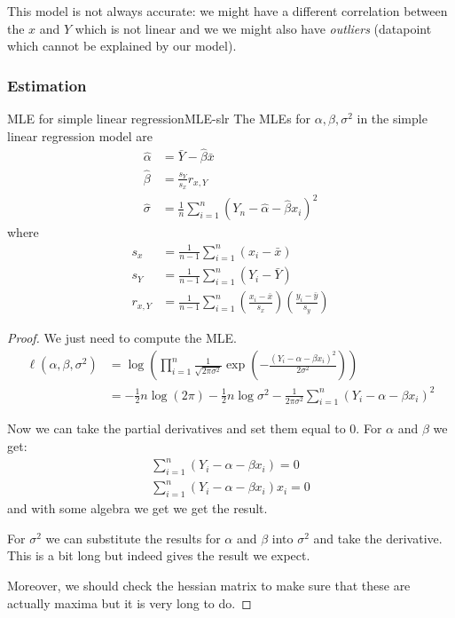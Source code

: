 \documentclass[12pt]{extarticle}
\begin{document}
This model is not always accurate: we might have a different correlation between the $x$ and $Y$ which is not linear
and we we might also have \emph{outliers} (datapoint which cannot be explained by our model).

\subsubsection{Estimation}

\begin{theorem}{MLE for simple linear regression}{MLE-slr}
    The MLEs for $\alpha, \beta, \sigma^2$ in the simple linear regression model are
    \begin{align}
        \hat \alpha & = \bar Y - \hat \beta \bar x                                       \\
        \hat \beta  & = \frac{s_Y}{s_x} r_{x, Y}                                         \\
        \hat \sigma & = \frac{1}{n} \sum_{i = 1}^n (Y_n - \hat \alpha- \hat \beta x_i)^2
    \end{align}
    where
    \begin{align}
        s_x      & = \frac{1}{n - 1} \sum^n_{i = 1}(x_i - \bar x)                                                              \\
        s_Y      & = \frac{1}{n - 1} \sum^n_{i = 1}(Y_i - \bar Y)                                                              \\
        r_{x, Y} & = \frac{1}{n - 1} \sum^n_{i = 1}\left(\frac{x_i - \bar x}{s_x}\right) \left(\frac{y_i - \bar y}{s_y}\right)
    \end{align}
\end{theorem}

\begin{proof}
    We just need to compute the MLE.
    \begin{align}
        \ell(\alpha, \beta, \sigma^2) & = \log\left( \prod_{i = 1}^n \frac{1}{\sqrt{2 \pi \sigma ^2}} \exp \left( - \frac{(Y_i - \alpha - \beta x_i)^2}{2 \sigma^2} \right) \right) \\
                                      & = -\frac{1}{2} n \log(2 \pi) - \frac{1}{2} n \log \sigma^2 - \frac{1}{2 \pi \sigma ^2} \sum_{i = 1}^n  (Y_i - \alpha - \beta x_i)^2
    \end{align}

    Now we can take the partial derivatives and set them equal to 0.
    For $\alpha$ and $\beta$ we get:
    \begin{gather}
        \sum_{i = 1}^n  (Y_i - \alpha - \beta x_i) = 0 \\
        \sum_{i = 1}^n  (Y_i - \alpha - \beta x_i) x_i = 0
    \end{gather}
    and with some algebra we get we get the result.

    For $\sigma^2$ we can substitute the results for $\alpha$ and $\beta$ into $\sigma^2$
    and take the derivative.
    This is a bit long but indeed gives the result we expect.

    Moreover, we should check the hessian matrix to make sure that these are actually maxima but it is very long to do.
\end{proof}
\end{document}
